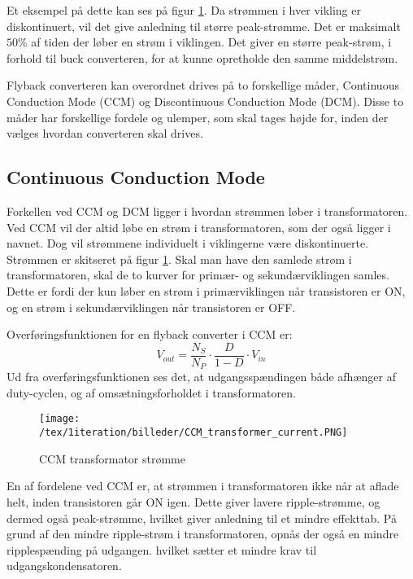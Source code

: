 Et eksempel på dette kan ses på figur \ref{fig:CCM_transformer_current}. Da strømmen i hver vikling er diskontinuert, vil det give anledning til større peak-strømme. Det er maksimalt $50\percent$ af tiden der løber en strøm i viklingen. Det giver en større peak-strøm, i forhold til buck converteren, for at kunne opretholde den samme middelstrøm.

Flyback converteren kan overordnet drives på to forskellige måder, Continuous Conduction Mode (CCM) og Discontinuous Conduction Mode (DCM). Disse to måder har forskellige fordele og ulemper, som skal tages højde for, inden der vælges hvordan converteren skal drives. 

\subsection{Continuous Conduction Mode}
Forkellen ved CCM og DCM ligger i hvordan strømmen løber i transformatoren. Ved CCM vil der altid løbe en strøm i transformatoren, som der også ligger i navnet. Dog vil strømmene individuelt i viklingerne være diskontinuerte. Strømmen er skitseret på figur \ref{fig:CCM_transformer_current}. Skal man have den samlede strøm i transformatoren, skal de to kurver for primær- og sekundærviklingen samles. Dette er fordi der kun løber en strøm i primærviklingen når transistoren er ON, og en strøm i sekundærviklingen når transistoren er OFF. 

\noindent Overføringsfunktionen for en flyback converter i CCM er\cite{SMPS-topologies2}:
\begin{equation} \label{flyback_converter_CCM_overforinsfunktion}
V_{out} = \frac{N_S}{N_P} \cdot \frac{D}{1-D} \cdot V_{in}
\end{equation}
Ud fra overføringsfunktionen ses det, at udgangsspændingen både afhænger af duty-cyclen, og af omsætningsforholdet i transformatoren. 

\begin{figure}[H]
	\center
	\texttt{[image: /tex/1iteration/billeder/CCM\_transformer\_current.PNG]}
	\caption{CCM transformator strømme}
	\label{fig:CCM_transformer_current}
\end{figure}

\noindent En af fordelene ved CCM er, at strømmen i transformatoren ikke når at aflade helt, inden transistoren går ON igen. Dette giver lavere ripple-strømme, og dermed også peak-strømme, hvilket giver anledning til et mindre effekttab. På grund af den mindre ripple-strøm i transformatoren, opnås der også en mindre ripplespænding på udgangen. hvilket sætter et mindre krav til udgangskondensatoren. 

